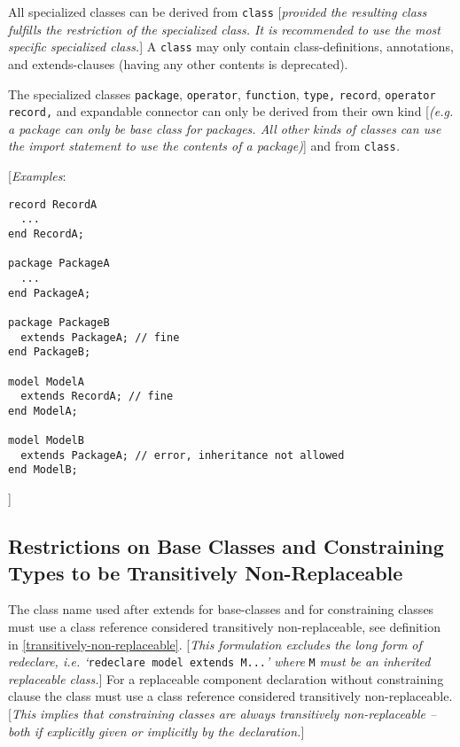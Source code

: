 All specialized classes can be derived from \lstinline!class! {[}\emph{provided the
resulting class fulfills the restriction of the specialized class. It is
recommended to use the most specific specialized class.}{]} A \lstinline!class! may
only contain class-definitions, annotations, and extends-clauses (having
any other contents is deprecated).

The specialized classes \lstinline!package!, \lstinline!operator!, \lstinline!function!,
\lstinline!type,! \lstinline!record!,
\lstinline!operator record,! and expandable connector can only be derived from their
own kind {[}\emph{(e.g. a package can only be base class for packages.
All other kinds of classes can use the import statement to use the
contents of a package)}{]} and from \lstinline!class!\emph{.}

{[}\emph{Examples}:
\begin{lstlisting}[language=modelica]
record RecordA
  ...
end RecordA;

package PackageA
  ...
end PackageA;

package PackageB
  extends PackageA; // fine
end PackageB;

model ModelA
  extends RecordA; // fine
end ModelA;

model ModelB
  extends PackageA; // error, inheritance not allowed
end ModelB;
\end{lstlisting}
{]}

\subsection{Restrictions on Base Classes and Constraining Types to be Transitively Non-Replaceable}

The class name used after extends for base-classes and for constraining
classes must use a class reference considered transitively
non-replaceable, see definition in \autoref{transitively-non-replaceable}. {[}\emph{This
formulation excludes the long form of redeclare, i.e. `}\lstinline!redeclare model extends M...!\emph{' where} \lstinline!M! \emph{must be an inherited replaceable
class.}{]} For a replaceable component declaration without constraining
clause the class must use a class reference considered transitively
non-replaceable. {[}\emph{This implies that constraining classes are
always transitively non-replaceable -- both if explicitly given or
implicitly by the declaration.}{]}

